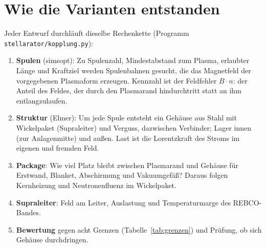 \documentclass[10pt,a4paper]{article}
\begin{document}
\section{Wie die Varianten entstanden}\label{sec:kette}
Jeder Entwurf durchläuft dieselbe Rechenkette (Programm \texttt{stellarator/kopplung.py}):
\begin{enumerate}\itemsep1pt
\item \textbf{Spulen} (simsopt): Zu Spulenzahl, Mindestabstand zum Plasma, erlaubter Länge und Kraftziel werden
Spulenbahnen gesucht, die das Magnetfeld der vorgegebenen Plasmaform erzeugen. Kennzahl ist der Feldfehler
$B\cdot n$: der Anteil des Feldes, der durch den Plasmarand hindurchtritt statt an ihm entlangzulaufen.
\item \textbf{Struktur} (Elmer): Um jede Spule entsteht ein Gehäuse aus Stahl mit Wickelpaket (Supraleiter) und
Verguss, dazwischen Verbinder; Lager innen (zur Anlagenmitte) und außen. Last ist die Lorentzkraft des Stroms im
eigenen und fremden Feld.
\item \textbf{Package}: Wie viel Platz bleibt zwischen Plasmarand und Gehäuse für Erstwand, Blanket, Abschirmung und
Vakuumgefäß? Daraus folgen Kernheizung und Neutronenfluenz im Wickelpaket.
\item \textbf{Supraleiter}: Feld am Leiter, Auslastung und Temperaturmarge des REBCO-Bandes.
\item \textbf{Bewertung} gegen acht Grenzen (Tabelle~\ref{tab:grenzen}) und Prüfung, ob sich Gehäuse durchdringen.
\end{enumerate}

\begin{table}[H]\centering\small
\caption{Grenzen, gegen die jeder Entwurf geprüft wird.}\label{tab:grenzen}\end{table}
\end{document}
